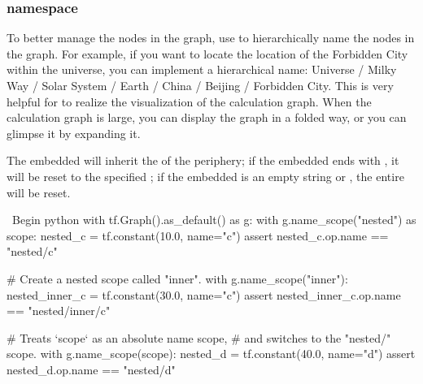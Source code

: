 \begin{content}

\subsubsection{namespace}

To better manage the nodes in the graph, use  to hierarchically name the nodes in the graph. For example, if you want to locate the location of the Forbidden City within the universe, you can implement a hierarchical name: Universe / Milky Way / Solar System / Earth / China / Beijing / Forbidden City. This is very helpful for  to realize the visualization of the calculation graph. When the calculation graph is large, you can display the graph in a folded way, or you can glimpse it by expanding it.

The embedded  will inherit the  of the periphery; if the embedded  ends with \code{/}, it will be reset to the specified ; if the embedded  is an empty string or , the entire  will be reset.

\begin{leftbar}
\ Begin {python}
with tf.Graph().as_default() as g:
  with g.name_scope("nested") as scope:
    nested_c = tf.constant(10.0, name="c")
    assert nested_c.op.name == "nested/c"

    # Create a nested scope called "inner".
    with g.name_scope("inner"):
      nested_inner_c = tf.constant(30.0, name="c")
      assert nested_inner_c.op.name == "nested/inner/c"

      # Treats `scope` as an absolute name scope, 
      # and switches to the "nested/" scope.
      with g.name_scope(scope):
        nested_d = tf.constant(40.0, name="d")
        assert nested_d.op.name == "nested/d"


\end{leftbar}
\end{content}

